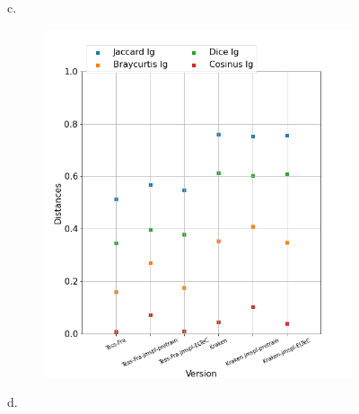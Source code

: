 \begin{figure}
\begin{minipage}{7cm}
\begin{subfigure}{0.99\textwidth}
  \label{fig:Reynolds _DIST_KRAKENBASE_LG}
  \end{subfigure}
  \end{minipage}
\begin{minipage}{7cm}
c.\
  \begin{subfigure}{0.99\textwidth}
  \includegraphics[height=.99\textwidth]{IMAGES/ELTeC_DISTANCES_spaCy3.5.1/DAUDET-graph-dist-spaCy3.5.1-lg.png} 
  \vspace{-0.25cm}
  \label{fig:Daudet_DIST_LG}
  \end{subfigure}
  \end{minipage}
\begin{minipage}{7cm}
d.\
  \begin{subfigure}{0.99\textwidth}

\end{subfigure}
\end{minipage}
\end{figure}
